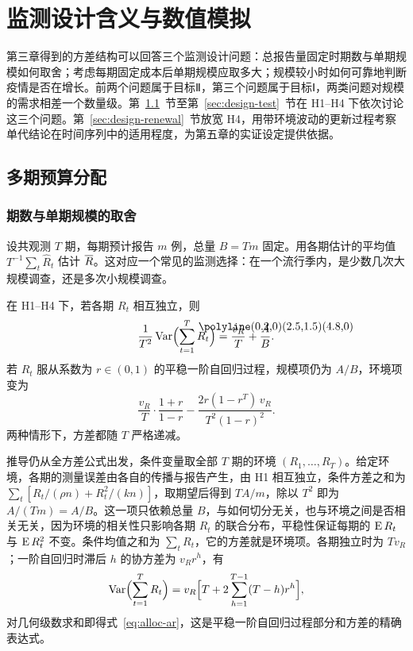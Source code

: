 \chapter{监测设计含义与数值模拟}
\label{chap:design}

第三章得到的方差结构可以回答三个监测设计问题：总报告量固定时期数与单期规模如何取舍；考虑每期固定成本后单期规模应取多大；规模较小时如何可靠地判断疫情是否在增长。前两个问题属于目标Ⅱ，第三个问题属于目标Ⅰ，两类问题对规模的需求相差一个数量级。第~\ref{sec:design-budget}~节至第~\ref{sec:design-test}~节在 H1--H4 下依次讨论这三个问题。第~\ref{sec:design-renewal}~节放宽 H4，用带环境波动的更新过程考察单代结论在时间序列中的适用程度，为第五章的实证设定提供依据。

\section{多期预算分配}
\label{sec:design-budget}

\subsection{期数与单期规模的取舍}

设共观测 $T$ 期，每期预计报告 $m$ 例，总量 $B=Tm$ 固定。用各期估计的平均值 $T^{-1}\sum_t\widehat R_t$ 估计 $\overline{R}$。这对应一个常见的监测选择：在一个流行季内，是少数几次大规模调查，还是多次小规模调查。

\begin{proposition}[多期分配]
\label{prop:allocation}
在 H1--H4 下，若各期 $R_t$ 相互独立，则
\begin{equation}
  \frac{1}{T^2}\Var\Bigl(\sum_{t=1}^{T}\widehat R_t\Bigr)=\frac{v_R}{T}+\frac{A}{B}.
  \label{eq:alloc-indep}
\end{equation}
若 $R_t$ 服从系数为 $r\in(0,1)$ 的平稳一阶自回归过程，规模项仍为 $A/B$，环境项变为
\begin{equation}
  \frac{v_R}{T}\cdot\frac{1+r}{1-r}-\frac{2r(1-r^T)\,v_R}{T^2(1-r)^2}.
  \label{eq:alloc-ar}
\end{equation}
两种情形下，方差都随 $T$ 严格递减。
\end{proposition}

推导仍从全方差公式出发，条件变量取全部 $T$ 期的环境 $(R_1,\dots,R_T)$。给定环境，各期的测量误差由各自的传播与报告产生，由 H1 相互独立，条件方差之和为 $\sum_t[R_t/(\rho n)+R_t^2/(kn)]$，取期望后得到 $TA/m$，除以 $T^2$ 即为 $A/(Tm)=A/B$。这一项只依赖总量 $B$，与如何切分无关，也与环境之间是否相关无关，因为环境的相关性只影响各期 $R_t$ 的联合分布，平稳性保证每期的 $\operatorname{E} R_t$ 与 $\operatorname{E} R_t^2$ 不变。条件均值之和为 $\sum_tR_t$，它的方差就是环境项。各期独立时为 $Tv_R$；一阶自回归时滞后 $h$ 的协方差为 $v_Rr^h$，有
\begin{equation}
  \operatorname{Var}\Bigl(\sum_{t=1}^{T}R_t\Bigr)=v_R\Bigl[T+2\sum_{h=1}^{T-1}(T-h)r^h\Bigr],
  \label{eq:ar-sum}
\end{equation}
对几何级数求和即得式~\eqref{eq:alloc-ar}，这是平稳一阶自回归过程部分和方差的精确表达式\citep{hamilton1994time}。

